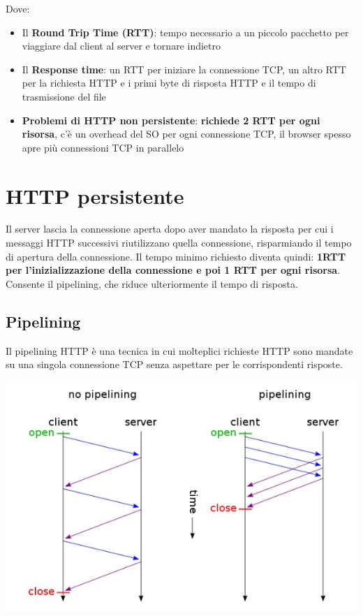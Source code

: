 Dove:
\begin{itemize}
    \item Il \textbf{Round Trip Time (RTT)}: tempo necessario a un piccolo pacchetto per viaggiare dal client al server e tornare indietro
    \item Il \textbf{Response time}: un RTT per iniziare la connessione TCP, un altro RTT per la richiesta HTTP e i primi byte di risposta HTTP e il tempo di trasmissione del file
    \item \textbf{Problemi di HTTP non persistente}: \textbf{richiede 2 RTT per ogni risorsa}, c'è un overhead del SO per ogni connessione TCP, il browser spesso apre più connessioni TCP in parallelo  
\end{itemize}


\section{HTTP persistente}
Il server lascia la connessione aperta dopo aver mandato la risposta per cui i messaggi HTTP successivi riutilizzano quella connessione, risparmiando il tempo di apertura della connessione. 
Il tempo minimo richiesto diventa quindi: \textbf{1RTT per l'inizializzazione della connessione e poi 1 RTT per ogni risorsa}.\\
Consente il pipelining, che riduce ulteriormente il tempo di risposta.

\subsection{Pipelining}
Il pipelining HTTP è una tecnica in cui molteplici richieste HTTP sono mandate su una singola connessione TCP senza aspettare per le corrispondenti risposte.
\begin{center}
\includegraphics[scale=0.4]{Images/TecnologieWeb/1/Pipelining.jpg}    
\end{center}

